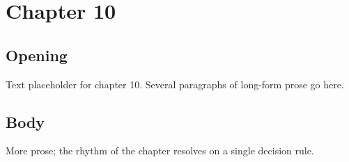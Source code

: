\chapter{Chapter 10}
\section{Opening}
Text placeholder for chapter 10. Several paragraphs of long-form prose go here.
\section{Body}
More prose; the rhythm of the chapter resolves on a single decision rule.
